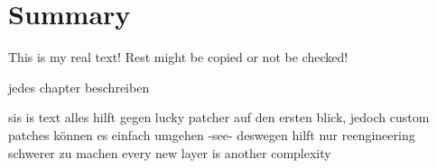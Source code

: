 \section{Summary}\label{section:conclusion-summary}
This is my real text! Rest might be copied or not be checked!

jedes chapter beschreiben

sis is text
alles hilft gegen lucky patcher auf den ersten blick, jedoch custom patches können es einfach umgehen -see- deswegen hilft nur reengineering schwerer zu machen\newline
every new layer is another complexity\newline
